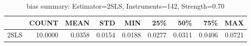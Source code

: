 \begin{table}[ht]
\centering
\caption{bias summary: Estimator=2SLS, Instruments=142, Strength=0.70}
\begin{tabular}{lrrrrrrrr}
\toprule
 & COUNT & MEAN & STD & MIN & 25\% & 50\% & 75\% & MAX \\
\midrule
2SLS & 10.0000 & 0.0358 & 0.0154 & 0.0188 & 0.0277 & 0.0311 & 0.0406 & 0.0721 \\
\bottomrule
\end{tabular}
\end{table}
